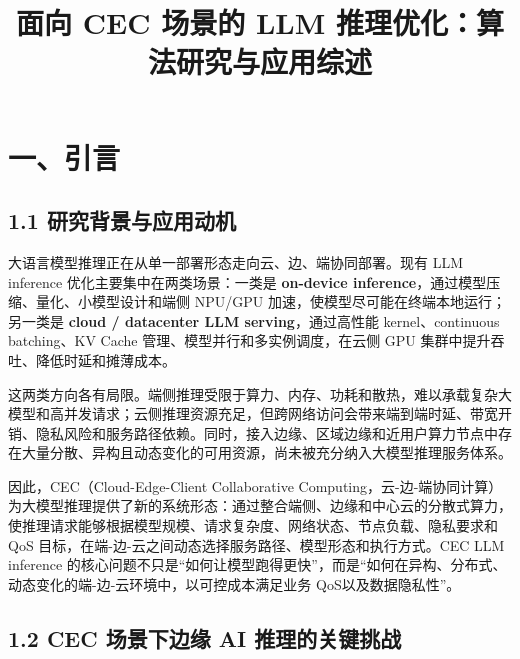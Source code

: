 \documentclass[a4paper,twocolumn,10pt]{ctexart}
\title{面向 CEC 场景的 LLM 推理优化：算法研究与应用综述}
\author{}
\date{}
\begin{document}
\maketitle
\tableofcontents
\vspace{0.8em}


\section{一、引言}

\subsection{1.1 研究背景与应用动机}

大语言模型推理正在从单一部署形态走向云、边、端协同部署。现有 LLM inference 优化主要集中在两类场景：一类是 \textbf{on-device inference}，通过模型压缩、量化、小模型设计和端侧 NPU/GPU 加速，使模型尽可能在终端本地运行；另一类是 \textbf{cloud / datacenter LLM serving}，通过高性能 kernel、continuous batching、KV Cache 管理、模型并行和多实例调度，在云侧 GPU 集群中提升吞吐、降低时延和摊薄成本。


这两类方向各有局限。端侧推理受限于算力、内存、功耗和散热，难以承载复杂大模型和高并发请求；云侧推理资源充足，但跨网络访问会带来端到端时延、带宽开销、隐私风险和服务路径依赖。同时，接入边缘、区域边缘和近用户算力节点中存在大量分散、异构且动态变化的可用资源，尚未被充分纳入大模型推理服务体系。


因此，CEC（Cloud-Edge-Client Collaborative Computing，云-边-端协同计算）为大模型推理提供了新的系统形态：通过整合端侧、边缘和中心云的分散式算力，使推理请求能够根据模型规模、请求复杂度、网络状态、节点负载、隐私要求和 QoS 目标，在端-边-云之间动态选择服务路径、模型形态和执行方式。CEC LLM inference 的核心问题不只是“如何让模型跑得更快”，而是“如何在异构、分布式、动态变化的端-边-云环境中，以可控成本满足业务 QoS以及数据隐私性”。




\subsection{1.2 CEC 场景下边缘 AI 推理的关键挑战}
\end{document}
